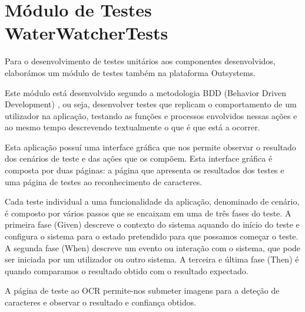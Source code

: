\section{Módulo de Testes WaterWatcherTests} \label{modtestes} %

Para o desenvolvimento de testes unitários aos componentes desenvolvidos, elaborámos um módulo de testes também na plataforma Outsystems.\par
Este módulo está desenvolvido segundo a metodologia BDD (Behavior Driven Development) \cite{bddtests}, ou seja, desenvolver testes que replicam o comportamento de um utilizador na aplicação, testando as funções e processos envolvidos nessas ações e ao mesmo tempo descrevendo textualmente o que é que está a ocorrer.\par
Esta aplicação possuí uma interface gráfica que nos permite observar o resultado dos cenários de teste e das ações que os compõem. Esta interface gráfica é composta por duas páginas: a página que apresenta os resultados dos testes e uma página de testes ao reconhecimento de caracteres.\par
Cada teste individual a uma funcionalidade da aplicação, denominado de cenário, é composto por vários passos que se encaixam em uma de três fases do teste. A primeira fase (Given) descreve o contexto do sistema aquando do início do teste e configura o sistema para o estado pretendido para que possamos começar o teste. A segunda fase (When) descreve um evento ou interação com o sistema, que pode ser iniciada por um utilizador ou outro sistema. A terceira e última fase (Then) é quando comparamos o resultado obtido com o resultado expectado.\par
A página de teste ao OCR permite-nos submeter imagens para a deteção de caracteres e observar o resultado e confiança obtidos.














